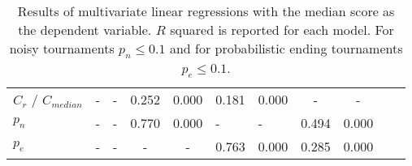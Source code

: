 \begin{table}[!htbp]
\begin{center}
{\begin{tabular}{lggccggccgg}
    $C_r$ / $C_{median}$ &      - &      - &  0.252 &  0.000 &  0.181 &  0.000 &      - &      - \\
    $p_n$                &      - &      - &  0.770 &  0.000 &      - &      - &  0.494 &  0.000 \\
    $p_e$                &      - &      - &      - &      - &  0.763 &  0.000 &  0.285 &  0.000 \\
    \bottomrule
\end{tabular}}
\end{center}
\caption{Results of multivariate linear regressions with the median score as the dependent variable.
\(R\) squared is reported for each model. For noisy tournaments $p_n \leq 0.1$
and for probabilistic ending tournaments $p_e \leq 0.1$.}
\label{table:linear_regression_on_median}
\end{table}

